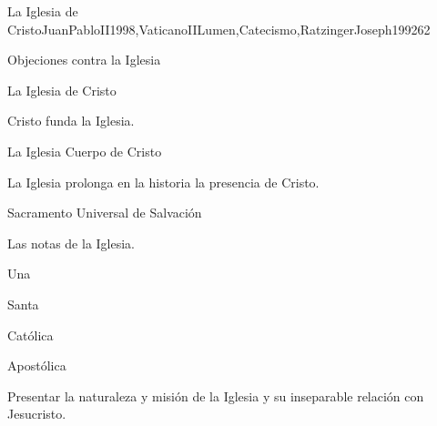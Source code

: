 \begin{syllabus}
\begin{unit}{La Iglesia de Cristo}{JuanPabloII1998,VaticanoIILumen,Catecismo,RatzingerJoseph1992}{6}{2}
\begin{topics}
      \item Objeciones contra la Iglesia
      \item La Iglesia de Cristo
      \begin{inparaenum}
      \item Cristo funda la Iglesia. 
      \item La Iglesia Cuerpo de Cristo
      \item La Iglesia prolonga en la historia la presencia de Cristo.
      \item Sacramento Universal de Salvación
\end{inparaenum}
      \item Las notas de la Iglesia.
      \begin{inparaenum}
      \item Una
      \item Santa
      \item Católica 
      \item Apostólica
\end{inparaenum}     

\end{topics}

\begin{unitgoals}
      \item Presentar la naturaleza y misión de la Iglesia y su inseparable relación con Jesucristo.
\end{unitgoals}
\end{unit}



\begin{coursebibliography}
\end{coursebibliography}

\end{syllabus}
